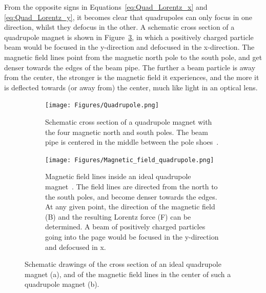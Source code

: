 From the opposite signs in Equations~\ref{eq:Quad_Lorentz_x} and \ref{eq:Quad_Lorentz_y}, it becomes clear that quadrupoles can only focus in one direction, whilst they defocus in the other.
A schematic cross section of a quadrupole magnet is shown in Figure~\ref{fig:Quadrupole}, in which a positively charged particle beam would be focused in the y-direction and defocused in the x-direction. 
The magnetic field lines point from the magnetic north pole to the south pole, and get denser towards the edges of the beam pipe.
The further a beam particle is away from the center, the stronger is the magnetic field it experiences, and the more it is deflected towards (or away from) the center, much like light in an optical lens.
\begin{figure}
\begin{subfigure}[t]{0.49\textwidth}
\centering
 \texttt{[image: Figures/Quadrupole.png]}
\caption[Cross-section of a quadrupole magnet]{Schematic cross section of a quadrupole magnet with the four magnetic north and south poles.
The beam pipe is centered in the middle between the pole shoes~\cite[p. 88]{Hinterberger}.}
\label{fig:Quadrupole:cross_section}
\end{subfigure}\hfill
\begin{subfigure}[t]{0.49\textwidth}
\centering
 \texttt{[image: Figures/Magnetic\_field\_quadrupole.png]}
\caption[Magnetic field in an ideal quadrupole magnet]{Magnetic field lines inside an ideal quadrupole magnet~\cite{QuadrupoleField}.
The field lines are directed from the north to the south poles, and become denser towards the edges.
At any given point, the direction of the magnetic field (B) and the resulting Lorentz force (F) can be determined.
A beam of positively charged particles going into the page would be focused in the y-direction and defocused in x.}
\label{fig:Quadrupole:field_lines}
\end{subfigure}
\caption[Schematic drawings of a quadrupole magnet with magnetic field lines]{Schematic drawings of the cross section of an ideal quadrupole magnet (a), and of the magnetic field lines in the center of such a quadrupole magnet (b).}
\label{fig:Quadrupole}
\end{figure}

